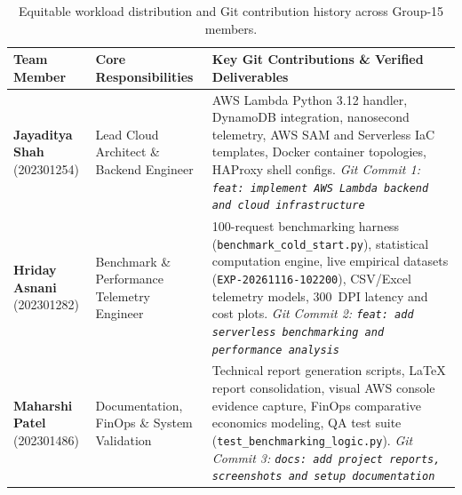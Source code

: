 \documentclass[10pt,a4paper]{article}
\begin{document}
\begin{table}[H]
\centering
\caption{Equitable workload distribution and Git contribution history across Group-15 members.}
\label{tab:team_contributions}
\small
\begin{tabularx}{\textwidth}{l p{3.2cm} X}
\toprule
\textbf{Team Member} & \textbf{Core Responsibilities} & \textbf{Key Git Contributions \& Verified Deliverables} \\
\midrule
\textbf{Jayaditya Shah} \newline (202301254) & Lead Cloud Architect \newline \& Backend Engineer & AWS Lambda Python 3.12 handler, DynamoDB integration, nanosecond telemetry, AWS SAM and Serverless IaC templates, Docker container topologies, HAProxy shell configs. \newline \textit{Git Commit 1: \texttt{feat: implement AWS Lambda backend and cloud infrastructure}} \\
\midrule
\textbf{Hriday Asnani} \newline (202301282) & Benchmark \& Performance \newline Telemetry Engineer & 100-request benchmarking harness (\texttt{benchmark\_cold\_start.py}), statistical computation engine, live empirical datasets (\texttt{EXP-20261116-102200}), CSV/Excel telemetry models, 300~DPI latency and cost plots. \newline \textit{Git Commit 2: \texttt{feat: add serverless benchmarking and performance analysis}} \\
\midrule
\textbf{Maharshi Patel} \newline (202301486) & Documentation, FinOps \newline \& System Validation & Technical report generation scripts, LaTeX report consolidation, visual AWS console evidence capture, FinOps comparative economics modeling, QA test suite (\texttt{test\_benchmarking\_logic.py}). \newline \textit{Git Commit 3: \texttt{docs: add project reports, screenshots and setup documentation}} \\
\bottomrule
\end{tabularx}
\end{table}
\end{document}
